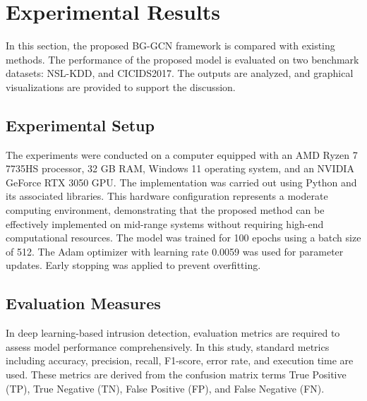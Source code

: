 \documentclass[a4paper,fleqn]{cas-sc}
\begin{document}
\section{Experimental Results}\label{sec:results}

In this section, the proposed BG-GCN framework is compared with existing methods. The performance of the proposed model is evaluated on two benchmark datasets: NSL-KDD, and CICIDS2017. The outputs are analyzed, and graphical visualizations are provided to support the discussion.

\subsection{Experimental Setup}\label{subsec:exp-setup}
The experiments were conducted on a computer equipped with an AMD Ryzen 7 7735HS processor, 32 GB RAM, Windows 11 operating system, and an NVIDIA GeForce RTX 3050 GPU. The implementation was carried out using Python and its associated libraries. This hardware configuration represents a moderate computing environment, demonstrating that the proposed method can be effectively implemented on mid-range systems without requiring high-end computational resources. The model was trained for 100 epochs using a batch size of 512. The Adam optimizer with learning rate 0.0059 was used for parameter updates. Early stopping was applied to prevent overfitting.
\subsection{Evaluation Measures}\label{subsec:eval}

In deep learning-based intrusion detection, evaluation metrics are required to assess model performance comprehensively. In this study, standard metrics including accuracy, precision, recall, F1-score, error rate, and execution time are used. These metrics are derived from the confusion matrix terms True Positive (TP), True Negative (TN), False Positive (FP), and False Negative (FN).
\end{document}
